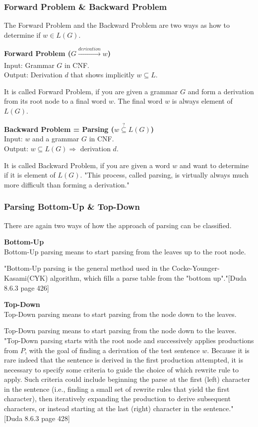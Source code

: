 \subsubsection{Forward Problem \& Backward Problem}
The Forward Problem and the Backward Problem are two ways as how to determine if $w \in L(G)$.	
\begin{DefGrey}
	\textbf{Forward Problem ($G \xrightarrow[]{derivation} w$)} \\
	Input: Grammar $G$ in CNF. \\
	Output: Derivation $d$ that shows implicitly $w \subseteq L$.
\end{DefGrey}
\noindent It is called Forward Problem, if you are given a grammar $G$ and form a derivation from its root node to a final word $w$. The final word $w$ is always element of $L(G)$.
\begin{DefGrey}
	\textbf{Backward Problem = Parsing ($w\overset{?}{\subseteq}L(G)$)}\\
	Input: $w$ and a grammar $G$ in CNF. \\
	Output: $w \subseteq L(G) \Longrightarrow$ derivation $d$.
\end{DefGrey}
\noindent It is called Backward Problem, if you are given a word $w$ and want to determine if it is element of $L(G)$. "This process, called parsing, is virtually always much more difficult than forming a derivation."
\subsubsection{Parsing Bottom-Up \& Top-Down}
There are again two ways of how the approach of parsing can be classified.
\begin{DefGrey}
	\textbf{Bottom-Up} \\
	 Bottom-Up parsing means to start parsing from the leaves up to the root node.
\end{DefGrey}
\noindent "Bottom-Up parsing is the general method used in the Cocke-Younger-Kasami(CYK) algorithm, which fills a parse table from the "bottom up"."[Duda 8.6.3 page 426]
\begin{DefGrey}
	\textbf{Top-Down} \\
	 Top-Down parsing means to start parsing from the node down to the leaves.
\end{DefGrey}
\noindent Top-Down parsing means to start parsing from the node down to the leaves. "Top-Down parsing starts with the root node and successively applies productions from $P$, with the goal of finding a derivation of the test sentence $w$. Because it is rare indeed that the sentence is derived in the first production attempted, it is necessary to specify some criteria to guide the choice of which rewrite rule to apply. Such criteria could include beginning the parse at the first (left) character in the sentence (i.e., finding a small set of rewrite rules that yield the first character), then iteratively expanding the production to derive subsequent characters, or instead starting at the last (right) character in the sentence." [Duda 8.6.3 page 428]\\

\pagebreak